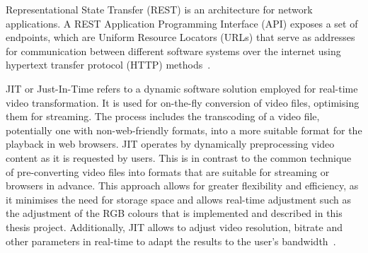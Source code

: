 \documentclass[../MasterThesis.tex]{subfiles}
\begin{document}







Representational State Transfer (REST) is an architecture for network applications. A REST Application Programming Interface (API) exposes a set of endpoints, which are Uniform Resource Locators (URLs) that serve as addresses for communication between different software systems over the internet using hypertext transfer protocol (HTTP) methods~\cite{IEEE_Rest, webservice, Nodejs_Rest}.



	
JIT or Just-In-Time refers to a dynamic software solution employed for real-time video transformation. 
It is used for on-the-fly conversion of video files, optimising them for streaming. The process includes the transcoding of a video file, potentially one with non-web-friendly formats, into a more suitable format for the playback in web browsers.
JIT operates by dynamically preprocessing video content as it is requested by users. This is in contrast to the common technique of pre-converting video files into formats that are suitable for streaming or browsers in advance. 
This approach allows for greater flexibility and efficiency, as it minimises the need for storage space and allows real-time adjustment such as the adjustment of the RGB colours that is implemented and described in this thesis project.
Additionally, JIT allows to adjust video resolution, bitrate and other parameters in real-time to adapt the results to the user's bandwidth~\cite{JIT_IEEE}.







\end{document}
